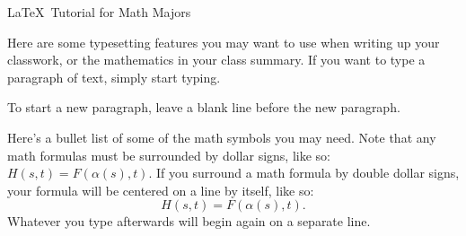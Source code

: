 \documentclass[12pt]{article}   %
\begin{document}

\centerline{\Large{\LaTeX \, Tutorial for Math Majors}} %

\vspace{1cm}

Here are some typesetting features you may want to use when writing up your classwork, or
the mathematics in your class summary. If you want to type a paragraph of text, simply
start typing.

To start a new paragraph, leave a blank line before the new paragraph.

\bigskip

Here's a bullet list of some of the math symbols you may need.  Note that any math
formulas must be surrounded by dollar signs, like so:  $H(s,t) = F(\alpha(s),t)$.  If you
surround a math formula by double dollar signs, your formula will be centered on a line by
itself, like so:
$$H(s,t) = F(\alpha(s),t).$$  Whatever you type afterwards will begin again on a separate line.
\end{document}
